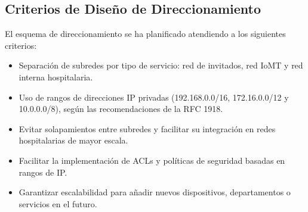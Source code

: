 \subsection{Criterios de Diseño de Direccionamiento}
El esquema de direccionamiento se ha planificado atendiendo a los siguientes criterios:
\begin{itemize}
    \item Separación de subredes por tipo de servicio: red de invitados, red IoMT y red interna hospitalaria.
    \item Uso de rangos de direcciones IP privadas (192.168.0.0/16, 172.16.0.0/12 y 10.0.0.0/8), según las recomendaciones de la RFC 1918.
    \item Evitar solapamientos entre subredes y facilitar su integración en redes hospitalarias de mayor escala.
    \item Facilitar la implementación de ACLs y políticas de seguridad basadas en rangos de IP.
    \item Garantizar escalabilidad para añadir nuevos dispositivos, departamentos o servicios en el futuro.
\end{itemize}

